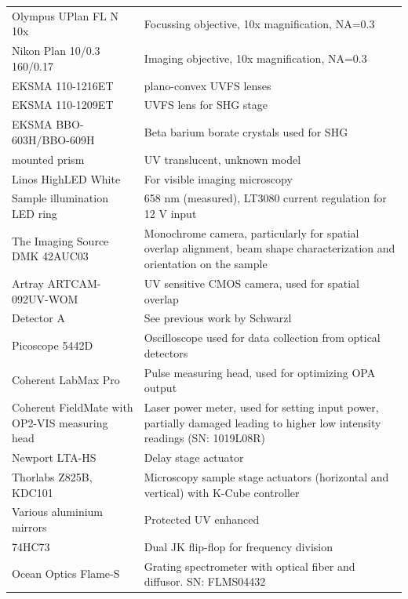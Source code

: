 \documentclass[twoside,openright,listof=numbered]{scrreprt}
\begin{document}
\begin{longtable}{p{}p{}}
    Olympus UPlan FL N 10x & Focussing objective, 10x magnification, NA=0.3 \\
    Nikon Plan 10/0.3 160/0.17 & Imaging objective, 10x magnification, NA=0.3 \\
    EKSMA 110-1216ET& plano-convex UVFS lenses\\
    EKSMA 110-1209ET& UVFS lens for SHG stage\\
    EKSMA BBO-603H/BBO-609H & Beta barium borate crystals used for SHG\\
    mounted prism & UV translucent, unknown model\\
    Linos HighLED White & For visible imaging microscopy \\
    Sample illumination LED ring & 658 nm (measured), LT3080 current regulation for 12 V input \\
    The Imaging Source DMK 42AUC03 & Monochrome camera, particularly for spatial overlap alignment, beam shape characterization and orientation on the sample \\
    Artray ARTCAM-092UV-WOM & UV sensitive CMOS camera, used for spatial overlap\\
    Detector A & See previous work by Schwarzl \cite{Schwarzl2022} \\
    Picoscope 5442D & Oscilloscope used for data collection from optical detectors \\
    Coherent LabMax Pro & Pulse measuring head, used for optimizing OPA output \\
    Coherent FieldMate with OP2-VIS measuring head & Laser power meter, used for setting input power, partially damaged leading to higher low intensity readings (SN: 1019L08R) \\
    Newport LTA-HS & Delay stage actuator \\
    Thorlabs Z825B, KDC101 & Microscopy sample stage actuators (horizontal and vertical) with K-Cube controller \\
    Various aluminium mirrors & Protected UV enhanced \\
    74HC73 & Dual JK flip-flop for frequency division\\
    Ocean Optics Flame-S & Grating spectrometer with optical fiber and diffusor. SN: FLMS04432 
\end{longtable}
\end{document}
